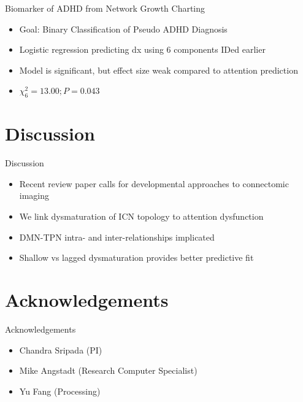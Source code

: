 \documentclass[presentation]{beamer}
\begin{document}
\begin{frame}[label={sec:orgheadline24}]{Biomarker of ADHD from Network Growth Charting}
\begin{itemize}
\item Goal: Binary Classification of Pseudo ADHD Diagnosis
\item Logistic regression predicting dx using 6 components IDed earlier
\item Model is significant, but effect size weak compared to attention prediction
\item \(\chi^2_6 = 13.00; P = 0.043\)
\end{itemize}
\end{frame}
\section{Discussion}
\label{sec:orgheadline27}
\begin{frame}[label={sec:orgheadline26}]{Discussion}
\begin{itemize}
\item Recent review paper calls for developmental approaches to connectomic imaging
\item We link dysmaturation of ICN topology to attention dysfunction
\item DMN-TPN intra- and inter-relationships implicated
\item Shallow vs lagged dysmaturation provides better predictive fit
\end{itemize}
\end{frame}
\section{Acknowledgements}
\label{sec:orgheadline29}
\begin{frame}[label={sec:orgheadline28}]{Acknowledgements}
\begin{itemize}
\item Chandra Sripada (PI)
\item Mike Angstadt (Research Computer Specialist)
\item Yu Fang (Processing)
\end{itemize}
\end{frame}
\end{document}
